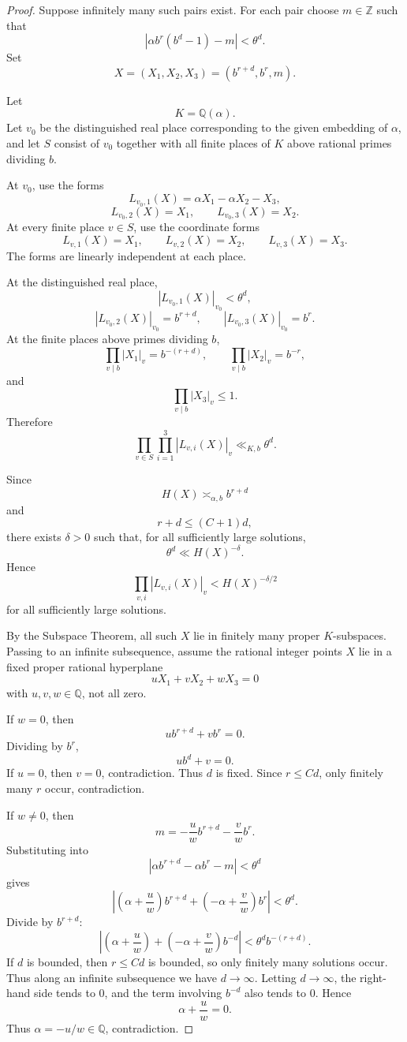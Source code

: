 \documentclass[11pt]{amsart}
\begin{document}
\begin{proof}
Suppose infinitely many such pairs exist. For each pair choose \(m\in\mathbb Z\) such that
\[
|\alpha b^r(b^d-1)-m|<\theta^d.
\]
Set
\[
X=(X_1,X_2,X_3)
=
(b^{r+d},b^r,m).
\]

Let
\[
K=\mathbb Q(\alpha).
\]
Let \(v_0\) be the distinguished real place corresponding to the given embedding of \(\alpha\), and let \(S\) consist of \(v_0\) together with all finite places of \(K\) above rational primes dividing \(b\).

At \(v_0\), use the forms
\[
L_{v_0,1}(X)=\alpha X_1-\alpha X_2-X_3,
\]
\[
L_{v_0,2}(X)=X_1,
\qquad
L_{v_0,3}(X)=X_2.
\]
At every finite place \(v\in S\), use the coordinate forms
\[
L_{v,1}(X)=X_1,
\qquad
L_{v,2}(X)=X_2,
\qquad
L_{v,3}(X)=X_3.
\]
The forms are linearly independent at each place.

At the distinguished real place,
\[
|L_{v_0,1}(X)|_{v_0}<\theta^d,
\]
\[
|L_{v_0,2}(X)|_{v_0}=b^{r+d},
\qquad
|L_{v_0,3}(X)|_{v_0}=b^r.
\]
At the finite places above primes dividing \(b\),
\[
\prod_{v\mid b}|X_1|_v=b^{-(r+d)},
\qquad
\prod_{v\mid b}|X_2|_v=b^{-r},
\]
and
\[
\prod_{v\mid b}|X_3|_v\leq1.
\]
Therefore
\[
\prod_{v\in S}\prod_{i=1}^3
|L_{v,i}(X)|_v
\ll_{K,b}
\theta^d.
\]

Since
\[
H(X)\asymp_{\alpha,b} b^{r+d}
\]
and
\[
r+d\leq(C+1)d,
\]
there exists \(\delta>0\) such that, for all sufficiently large solutions,
\[
\theta^d
\ll
H(X)^{-\delta}.
\]
Hence
\[
\prod_{v,i}|L_{v,i}(X)|_v
<
H(X)^{-\delta/2}
\]
for all sufficiently large solutions.

By the Subspace Theorem, all such \(X\) lie in finitely many proper \(K\)-subspaces. Passing to an infinite subsequence, assume the rational integer points \(X\) lie in a fixed proper rational hyperplane
\[
uX_1+vX_2+wX_3=0
\]
with \(u,v,w\in\mathbb Q\), not all zero.

If \(w=0\), then
\[
ub^{r+d}+vb^r=0.
\]
Dividing by \(b^r\),
\[
ub^d+v=0.
\]
If \(u=0\), then \(v=0\), contradiction. Thus \(d\) is fixed. Since \(r\leq Cd\), only finitely many \(r\) occur, contradiction.

If \(w\neq0\), then
\[
m=-\frac{u}{w}b^{r+d}-\frac{v}{w}b^r.
\]
Substituting into
\[
|\alpha b^{r+d}-\alpha b^r-m|<\theta^d
\]
gives
\[
\left|
\left(\alpha+\frac{u}{w}\right)b^{r+d}
+
\left(-\alpha+\frac{v}{w}\right)b^r
\right|
<\theta^d.
\]
Divide by \(b^{r+d}\):
\[
\left|
\left(\alpha+\frac{u}{w}\right)
+
\left(-\alpha+\frac{v}{w}\right)b^{-d}
\right|
<
\theta^d b^{-(r+d)}.
\]
If \(d\) is bounded, then \(r\leq Cd\) is bounded, so only finitely many solutions occur. Thus along an infinite subsequence we have \(d\to\infty\). Letting \(d\to\infty\), the right-hand side tends to \(0\), and the term involving \(b^{-d}\) also tends to \(0\). Hence
\[
\alpha+\frac{u}{w}=0.
\]
Thus \(\alpha=-u/w\in\mathbb Q\), contradiction.
\end{proof}
\end{document}
